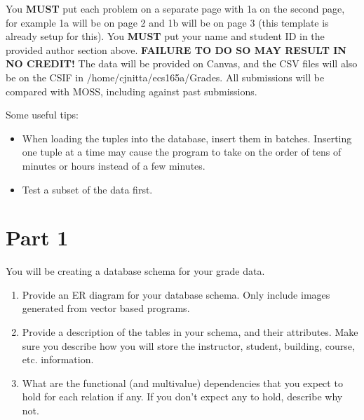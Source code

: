 \documentclass{article}
\begin{document}
You {\bf MUST} put each problem on a separate page with 1a on the second page, for example 1a will be on page 2 and 1b will be on page 3 (this template is already setup for this). 
You {\bf MUST} put your name and student ID in the provided author section above. {\bf FAILURE TO DO SO MAY RESULT IN NO CREDIT!} 
The data will be provided on Canvas, and the CSV files will also be on the CSIF in /home/cjnitta/ecs165a/Grades. All submissions will be compared with MOSS, including against past submissions.

Some useful tips: 
\begin{itemize}
\item When loading the tuples into the database, insert them in batches. Inserting one tuple at a time may cause the program to take on the order of tens of minutes or hours instead of a few minutes.
\item Test a subset of the data first.
\end{itemize}

\clearpage
\section*{Part 1}
You will be creating a database schema for your grade data.

\begin{enumerate}[label=\alph*.]
\item Provide an ER diagram for your database schema. Only include images generated from vector based programs. \\
 \clearpage
\item Provide a description of the tables in your schema, and their attributes. Make sure you describe how you will store the instructor, student, building, course, etc. information. \\
 \clearpage
\item What are the functional (and multivalue) dependencies that you expect to hold for each relation if any. If you don't expect any to hold, describe why not. \\
 \clearpage
\end{enumerate}
\end{document}
